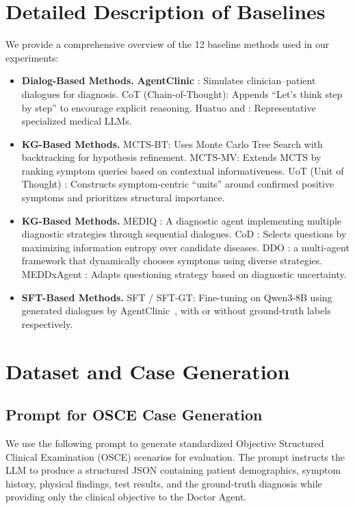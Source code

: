 \documentclass[11pt]{article}
\begin{document}
\section{Detailed Description of Baselines}
\label{appendix1}
We provide a comprehensive overview of the 12 baseline methods used in our experiments:
\begin{itemize}
	\item \textbf{Dialog-Based Methods.} \textbf{AgentClinic} \cite{agentclinic2024samuel}: Simulates clinician–patient dialogues for diagnosis.
	CoT (Chain-of-Thought): Appends ``Let’s think step by step'' to encourage explicit reasoning.
	Huatuo \cite{huatuo2023wang} and  \cite{meditron2023chen}: Representative specialized medical LLMs.
	\item \textbf{KG-Based Methods.} 
	MCTS-BT: Uses Monte Carlo Tree Search with backtracking for hypothesis refinement.
	MCTS-MV: Extends MCTS by ranking symptom queries based on contextual informativeness.
	UoT (Unit of Thought) \cite{uot2024hu}: Constructs symptom-centric ``units'' around confirmed positive symptoms and prioritizes structural importance. 
	\item \textbf{KG-Based Methods.} 
	MEDIQ \cite{mediq2024li}: A diagnostic agent implementing multiple diagnostic strategies through sequential dialogues.
	CoD \cite{cod2025chen}: Selects questions by maximizing information entropy over candidate diseases.
	DDO \cite{ddo2025jia}: a multi-agent framework that dynamically chooses symptoms using diverse strategies.
	MEDDxAgent \cite{meddxagent2025rose}: Adapts questioning strategy based on diagnostic uncertainty.
	\item \textbf{SFT-Based Methods.} SFT / SFT-GT: Fine-tuning on Qwen3-8B using generated dialogues by AgentClinic~\cite{agentclinic2024samuel}, with or without ground-truth labels respectively.
\end{itemize}

\section{Dataset and Case Generation}

\subsection{Prompt for OSCE Case Generation}

We use the following prompt to generate standardized Objective Structured Clinical Examination (OSCE) scenarios for evaluation.
The prompt instructs the LLM to produce a structured JSON containing patient demographics, symptom history, physical findings, test results, and the ground-truth diagnosis while providing only the clinical objective to the Doctor Agent.
\end{document}
